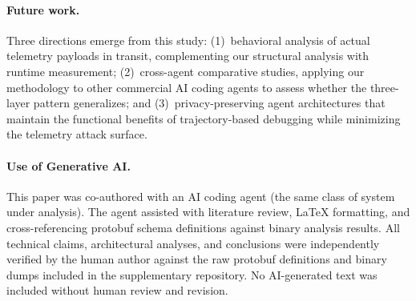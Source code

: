 \documentclass[sigconf,anonymous]{acmart}
\begin{document}
\paragraph{Future work.}
Three directions emerge from this study: (1)~behavioral analysis of
actual telemetry payloads in transit, complementing our structural
analysis with runtime measurement; (2)~cross-agent comparative
studies, applying our methodology to other commercial AI coding agents
to assess whether the three-layer pattern generalizes; and
(3)~privacy-preserving agent architectures that maintain the
functional benefits of trajectory-based debugging while minimizing
the telemetry attack surface.

\paragraph{Use of Generative AI.}
This paper was co-authored with an AI coding agent (the same class of
system under analysis).  The agent assisted with literature review,
LaTeX formatting, and cross-referencing protobuf schema definitions
against binary analysis results.  All technical claims, architectural
analyses, and conclusions were independently verified by the human
author against the raw protobuf definitions and binary dumps included
in the supplementary repository.  No AI-generated text was included
without human review and revision.


\end{document}
